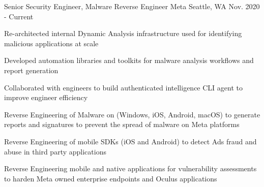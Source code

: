 


\begin{cventries}




\cventry
{Senior Security Engineer, Malware Reverse Engineer} %
{Meta} %
{Seattle, WA} %
{Nov. 2020 - Current} %
{ %
\begin{cvitems}
\item {Re-architected internal Dynamic Analysis infrastructure used for identifying malicious applications at scale}
\item {Developed automation libraries and toolkits for malware analysis workflows and report generation}
\item {Collaborated with engineers to build authenticated intelligence CLI agent to improve engineer efficiency}
\item {Reverse Engineering of Malware on (Windows, iOS, Android, macOS) to generate reports and signatures to prevent the spread of malware on Meta platforms}
\item {Reverse Engineering of mobile SDKs (iOS and Android) to detect Ads fraud and abuse in third party applications}
\item {Reverse Engineering mobile and native applications for vulnerability assessments to harden Meta owned enterprise endpoints and Oculus applications}
\end{cvitems}
}


\end{cventries}
